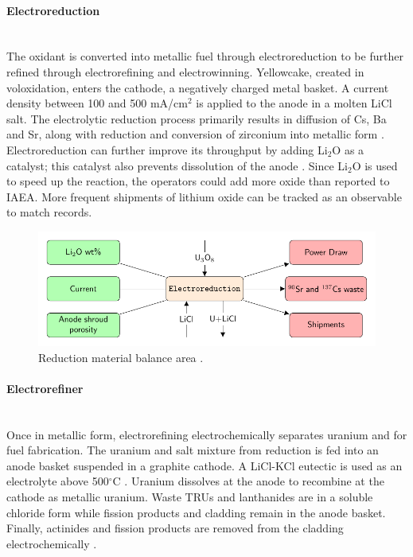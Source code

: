 \paragraph{Electroreduction} \mbox{}\\
The oxidant is converted into metallic fuel through electroreduction to be further refined through electrorefining and electrowinning. 
Yellowcake, created in voloxidation, enters the cathode, a negatively charged metal basket. 
A current density between 100 and 500 mA/cm$^2$ is applied to the anode in a molten LiCl salt. 
The electrolytic reduction process primarily results in diffusion of Cs, Ba and Sr, along with reduction and conversion of zirconium into metallic form \cite{choi_electrochemical_2015,flowsheet_1998}.
Electroreduction can further improve its throughput by adding Li$_2$O as a catalyst; this catalyst also prevents dissolution 
of the anode \cite{choi_electrochemical_2015}. Since Li$_2$O is used to speed up the reaction,
the operators could add more oxide than reported to \gls{IAEA}. More frequent shipments 
of lithium oxide can be tracked as an observable to match records.

\begin{figure}[h]
	\centering
	\includegraphics[width=0.9\linewidth]{images/reduction}
	\caption{Reduction material balance area \cite{lee_advanced_2008}.}
	\label{fig:reduction}
\end{figure}

\paragraph{Electrorefiner} \mbox{}\\
Once in metallic form, electrorefining electrochemically separates uranium and  for fuel fabrication.
The uranium and salt mixture from reduction is fed into an anode basket suspended in a graphite cathode. 
A LiCl-KCl eutectic is used as an electrolyte above 500$^{\circ}$C \cite{flowsheet_1998,lee_korean_2011}. 
Uranium dissolves at the anode to recombine at the cathode as metallic uranium.
Waste \glspl{TRU} and lanthanides are in a soluble chloride form  while fission products and cladding remain in the anode
basket. Finally, actinides and fission products are removed from the cladding electrochemically \cite{lee_korean_2011}.

